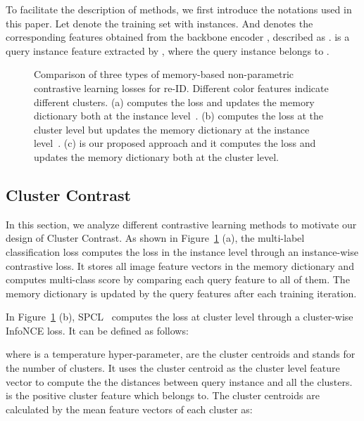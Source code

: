To facilitate the description of methods, we first introduce the notations used in this paper.
Let  denote the training set with  instances. 
And  denotes the corresponding features obtained from the backbone encoder , described as .
 is a query instance feature extracted by , where the query instance belongs to .

\begin{figure}[!t]
    \hfill
    \hfill
	\caption{Comparison of three types of memory-based non-parametric contrastive learning losses for re-ID. Different color features indicate different clusters. (a) computes the loss and updates the memory dictionary both at the instance level~\cite{wang2020unsupervised}. (b) computes the loss at the cluster level but updates the memory dictionary at the instance level~\cite{ge2020self}. (c) is our proposed approach and it computes the loss and updates the memory dictionary both at the cluster level.}
	\label{fig:loss}
\end{figure}

\subsection{Cluster Contrast}
\label{sec:ContrastiveLearning}

In this section, we analyze different contrastive learning methods to motivate our design of Cluster Contrast. As shown in Figure~\ref{fig:loss} (a), the multi-label classification loss computes the loss in the instance level through an instance-wise contrastive loss. It stores all image feature vectors in the memory dictionary and computes multi-class score by comparing each query feature to all of them. The memory dictionary is updated by the query features after each training iteration.




In Figure~\ref{fig:loss} (b), SPCL~\cite{ge2020self} computes the loss at cluster level through a cluster-wise InfoNCE loss. It can be defined as follows:


where  is a temperature hyper-parameter,   are the cluster centroids and  stands for the number of clusters. 
It uses the cluster centroid as the cluster level feature vector to compute the the distances between query instance  and all the clusters.  is the positive cluster feature which  belongs to.
The cluster centroids are calculated by the mean feature vectors of each cluster as:

